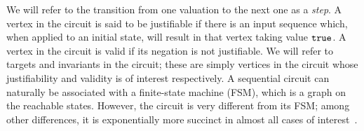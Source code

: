 

%

%
We will refer to the transition from one valuation
to the next one as a {\em step}.  A vertex in the circuit is
said to be justifiable if there is an input sequence which, when
applied to an initial state, will result in that vertex
taking value $\mathtt{true}$.  A vertex in the circuit is
valid if its negation is not justifiable.  We will refer
to targets and invariants in the circuit; these are simply
vertices in the circuit whose justifiability and validity
is of interest respectively.
A sequential circuit can naturally
be associated with a finite-state machine (FSM),
which is a graph on the reachable states.  However, the 
circuit is very different from its FSM; among
other differences, it is exponentially more succinct in
almost all cases of interest~\cite{BuClMcDiHw92}. 
%
%

